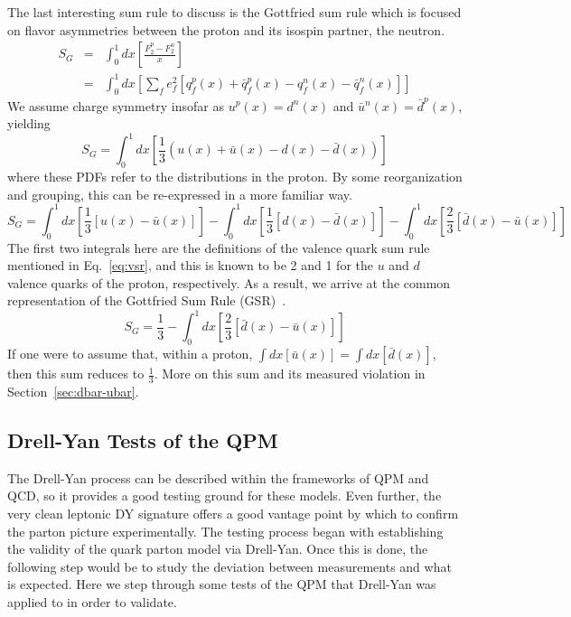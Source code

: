 The last interesting sum rule to discuss is the Gottfried sum rule which is focused on flavor asymmetries between the proton and its isospin partner, the neutron.
\begin{eqnarray}
S_G & = & \int_0^1 dx \left[\frac{F_2^p - F_2^n}{x}\right] \\
& = & \int_0^1 dx \left[ \sum\limits_f e_f^2 [q_f^p(x) + \bar{q}_f^p(x) - q_f^n(x) - \bar{q}_f^n(x)] \right]
\end{eqnarray}
We assume charge symmetry insofar as $u^p(x) = d^n(x)$ and $\bar{u}^n (x) = \bar{d}^p(x)$, yielding
\begin{equation}
S_G = \int_0^1 dx \left[ \frac{1}{3} (u(x) + \bar{u}(x) - d(x) - \bar{d}(x)) \right]
\end{equation}
where these PDFs refer to the distributions in the proton. By some reorganization and grouping, this can be re-expressed in a more familiar way.
\begin{equation}
S_G = \int_0^1 dx \left[\frac{1}{3} [u(x) - \bar{u}(x)] \right] - 
\int_0^1 dx \left[\frac{1}{3} [d(x) - \bar{d}(x)] \right] -
\int_0^1 dx \left[\frac{2}{3} [\bar{d}(x) - \bar{u}(x)] \right]
\end{equation}
The first two integrals here are the definitions of the valence quark sum rule mentioned in Eq.~\ref{eq:vsr}, and this is known to be 2 and 1 for the $u$ and $d$ valence quarks of the proton, respectively. As a result, we arrive at the common representation of the Gottfried Sum Rule (GSR)~\cite{Gottfried:1967kk}.
\begin{equation}
S_G = \frac{1}{3} - \int_0^1 dx \left[ \frac{2}{3} [\bar{d}(x) - \bar{u}(x)] \right]
\label{eq:gsr}
\end{equation}
If one were to assume that, within a proton, $\int dx [\bar{u}(x)] = \int dx[\bar{d}(x)]$, then this sum reduces to $\frac{1}{3}$. More on this sum and its measured violation in Section~\ref{sec:dbar-ubar}.

\subsection{Drell-Yan Tests of the QPM}

The Drell-Yan process can be described within the frameworks of QPM and QCD, so it provides a good testing ground for these models. Even further, the very clean leptonic DY signature offers a good vantage point by which to confirm the parton picture experimentally. The testing process began with establishing the validity of the quark parton model via Drell-Yan. Once this is done, the following step would be to study the deviation between measurements and what is expected. Here we step through some tests of the QPM that Drell-Yan was applied to in order to validate.


